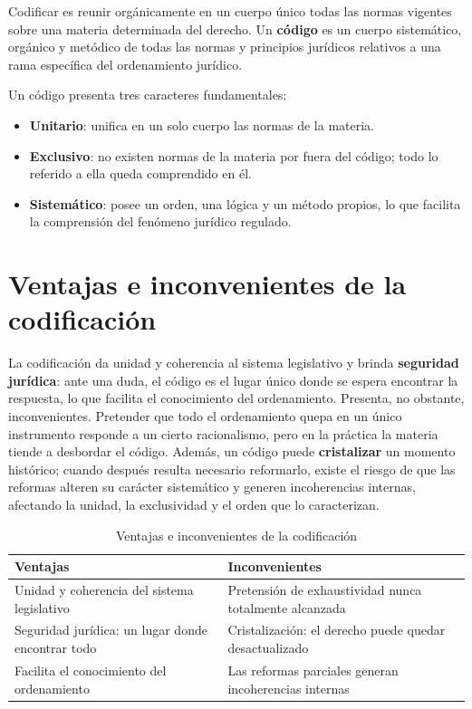 \documentclass[12pt,oneside]{book}
\begin{document}
\begin{definicion}[Codificación]
Codificar es reunir orgánicamente en un cuerpo único todas las normas vigentes sobre una materia determinada del derecho. Un \textbf{código} es un cuerpo sistemático, orgánico y metódico de todas las normas y principios jurídicos relativos a una rama específica del ordenamiento jurídico.
\end{definicion}

Un código presenta tres caracteres fundamentales:

\begin{itemize}
\item \textbf{Unitario}: unifica en un solo cuerpo las normas de la materia.
\item \textbf{Exclusivo}: no existen normas de la materia por fuera del código; todo lo referido a ella queda comprendido en él.
\item \textbf{Sistemático}: posee un orden, una lógica y un método propios, lo que facilita la comprensión del fenómeno jurídico regulado.
\end{itemize}

\section{Ventajas e inconvenientes de la codificación}

La codificación da unidad y coherencia al sistema legislativo y brinda \textbf{seguridad jurídica}: ante una duda, el código es el lugar único donde se espera encontrar la respuesta, lo que facilita el conocimiento del ordenamiento. Presenta, no obstante, inconvenientes. Pretender que todo el ordenamiento quepa en un único instrumento responde a un cierto racionalismo, pero en la práctica la materia tiende a desbordar el código. Además, un código puede \textbf{cristalizar} un momento histórico; cuando después resulta necesario reformarlo, existe el riesgo de que las reformas alteren su carácter sistemático y generen incoherencias internas, afectando la unidad, la exclusividad y el orden que lo caracterizan.

\begin{table}[H]
\centering
\begin{tabularx}{\textwidth}{YY}
\toprule
\textbf{Ventajas} & \textbf{Inconvenientes} \\
\midrule
Unidad y coherencia del sistema legislativo & Pretensión de exhaustividad nunca totalmente alcanzada \\
Seguridad jurídica: un lugar donde encontrar todo & Cristalización: el derecho puede quedar desactualizado \\
Facilita el conocimiento del ordenamiento & Las reformas parciales generan incoherencias internas \\
\bottomrule
\end{tabularx}
\caption{Ventajas e inconvenientes de la codificación}
\end{table}
\end{document}
